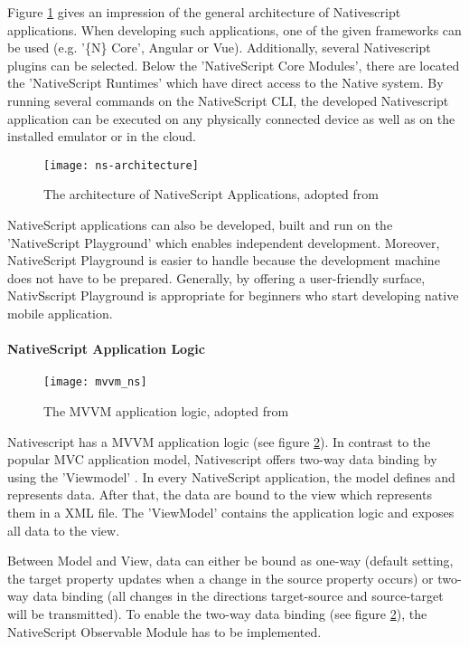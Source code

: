 Figure \ref{fig:nsarchitecture} gives an impression of the general architecture of Nativescript applications. When developing such applications, one of the given frameworks can be used (e.g. '\{N\} Core', Angular or Vue). Additionally, several Nativescript plugins can be selected. Below the 'NativeScript Core Modules', there are located the 'NativeScript Runtimes' which have direct access to the Native system. By running several commands on the NativeScript \ac{CLI}, the developed Nativescript application can be executed on any physically connected device as well as on the installed emulator or in the cloud. 

\begin{figure}
\centering
\texttt{[image: ns-architecture]} 
\caption{\label{fig:nsarchitecture}The architecture of NativeScript Applications, adopted from \cite{nsarchitecture}} 
\end{figure}

NativeScript applications can also be developed, built and run on the 'NativeScript Playground' \cite{nsplayground} which enables independent development. Moreover, NativeScript Playground is easier to handle because the development machine does not have to be prepared. Generally, by offering a user-friendly surface, NativSscript Playground is appropriate for beginners who start developing native mobile application.

\paragraph{NativeScript Application Logic}

\begin{figure}
\centering
\texttt{[image: mvvm\_ns]} 
\caption{\label{fig:mvvm}The MVVM application logic, adopted from \cite{nativescript}} 
\end{figure}

Nativescript has a \ac{MVVM} application logic (see figure \ref{fig:mvvm}). In contrast to the popular \ac{MVC} application model, Nativescript offers two-way data binding by using the 'Viewmodel' \cite{nativescript}. In every NativeScript application, the model defines and represents data. After that, the data are bound to the view which represents them in a XML file. The 'ViewModel' contains the application logic and exposes all data to the view. 

Between Model and View, data can either be bound as one-way (default setting, the target property updates when a change in the source property occurs) or two-way data binding (all changes in the directions target-source and source-target will be transmitted). To enable the two-way data binding (see figure \ref{fig:mvvm}), the NativeScript Observable Module has to be implemented. 

